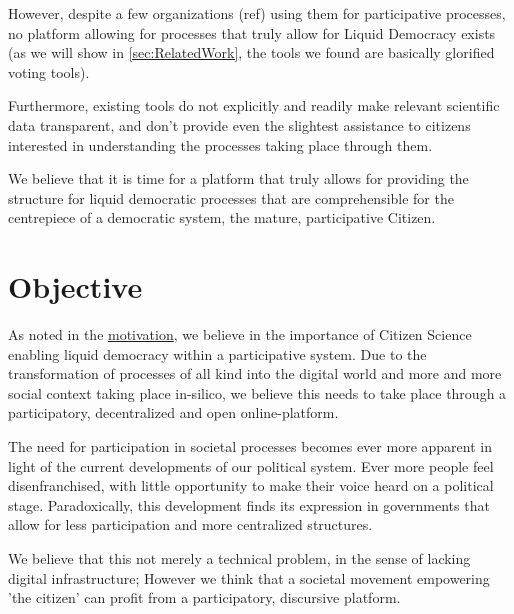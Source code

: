 

However, despite a few organizations (ref) using them for participative processes, no platform allowing for processes that truly allow for Liquid Democracy exists (as we will show in \ref{sec:RelatedWork}, the tools we found are basically glorified voting tools). 

Furthermore, existing tools do not explicitly and readily make relevant scientific data transparent, and don't provide even the slightest assistance to citizens interested in understanding the processes taking place through them. 

We believe that it is time for a platform that truly allows for providing the structure for liquid democratic processes that are comprehensible for the centrepiece of a democratic system, the mature, participative Citizen.


\section{Objective}
\label{sec:Objective}


As noted in the \hyperref[sec:Motivation]{motivation}, we believe in the importance of Citizen Science enabling liquid democracy within a participative system. Due to the transformation of processes of all kind into the digital world and more and more social context taking place in-silico, we believe this needs to take place through a participatory, decentralized and open online-platform.

The need for participation in societal processes becomes ever more apparent in light of the current developments of our political system. Ever more people feel disenfranchised, with little opportunity to make their voice heard on a political stage. Paradoxically, this development finds its expression in governments that allow for less participation and more centralized structures.

We believe that this not merely a technical problem, in the sense of lacking digital infrastructure; However we think that a societal movement empowering 'the citizen' can profit from a participatory, discursive platform.

